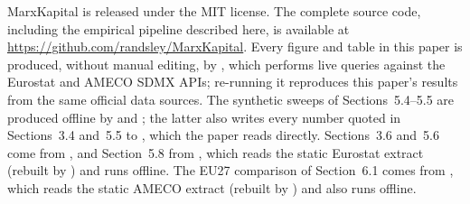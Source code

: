 \documentclass[11pt]{article}
\begin{document}
MarxKapital is released under the MIT license. The complete source code,
including the empirical pipeline described here, is available at
\url{https://github.com/randsley/MarxKapital}. Every figure and table in
this paper is produced, without manual editing, by
, which performs live queries against
the Eurostat and AMECO SDMX APIs; re-running it reproduces this paper's
results from the same official data sources. The synthetic sweeps of
Sections~5.4--5.5 are produced offline by 
and ; the latter also writes every
number quoted in Sections~3.4 and~5.5 to
, which the paper reads
directly. Sections~3.6 and~5.6 come from
, and Section~5.8 from
, which reads the static Eurostat extract
 (rebuilt by
) and runs offline. The EU27
comparison of Section~6.1 comes from ,
which reads the static AMECO extract  (rebuilt
by ) and also runs offline.



\end{document}

